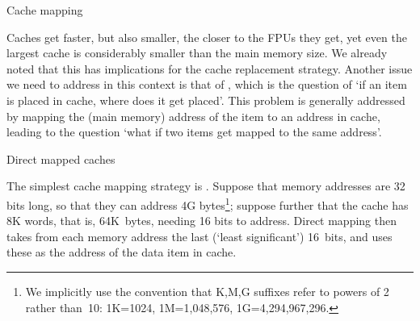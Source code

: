 
 {Cache mapping}

Caches get faster, but also smaller, the closer to the \acp{FPU} they
get, yet even the largest cache is considerably smaller than the main
memory size. We already noted that this has implications for the cache
replacement strategy. Another issue we need to address in this context
is that of , which is the question of `if
an item is placed in cache, where does it get placed'. This problem is
generally addressed by mapping the (main memory) address of the item
to an address in cache, leading to the question `what if two items get
mapped to the same address'.

 {Direct mapped caches}
\label{sec:directmap}

The simplest cache mapping strategy is . Suppose that memory addresses are 32 bits long, so that
they can address 4G bytes\footnote{We implicitly use the convention
  that K,M,G suffixes refer to powers of 2 rather than~10: 1K=1024,
  1M=1,048,576, 1G=4,294,967,296.}; suppose further that the
cache has 8K words, that is, 64K~bytes, needing 16 bits to address.
Direct mapping then takes from each memory address the last (`least
significant') 16~bits,
and uses these as the address of the data item in cache.

